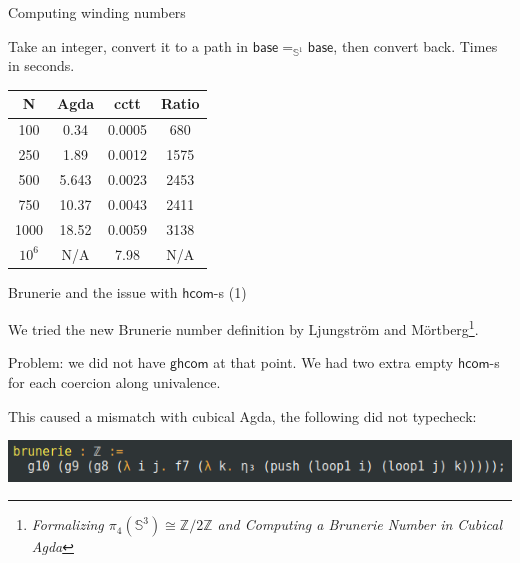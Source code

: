 \documentclass[dvipsnames]{beamer}
\newcommand{\ms}[1]{\mathsf{#1}}
\newcommand{\mbb}[1]{\mathbb{#1}}
\newcommand{\hcom}{\ms{hcom}}
\newcommand{\ghcom}{\ms{ghcom}}
\begin{document}
\begin{frame}{Computing winding numbers}

Take an integer, convert it to a path in $\ms{base} =_{\mbb{S}^1} \ms{base}$, then convert back.
Times in seconds.
\vspace{1em}

\begin{center}
\begin{tabular}{|c||c|c|c|}
\hline
  \textbf{N} & \textbf{Agda} & \textbf{cctt} & \textbf{Ratio} \\
\hline
\hline
  100 & 0.34 & 0.0005 & 680 \\
\hline
  250 & 1.89 & 0.0012 & 1575 \\
\hline
  500 & 5.643 & 0.0023 & 2453 \\
\hline
  750 & 10.37 & 0.0043 & 2411 \\
\hline
  1000 & 18.52 & 0.0059 & 3138 \\
\hline
  $10^6$ & N/A & 7.98 & N/A \\
\hline
\end{tabular}
\end{center}

\end{frame}

\begin{frame}{Brunerie and the issue with $\hcom$-s (1)}

We tried the new Brunerie number definition by Ljungström and Mörtberg\footnote{\emph{Formalizing $\pi_4(\mbb{S}^3) \cong \mbb{Z}/2\mbb{Z}$ and Computing a Brunerie Number in Cubical Agda}}.
\vspace{1em}

Problem: we did not have $\ghcom$ at that point. We had two extra empty $\hcom$-s
for each coercion along univalence.
\vspace{1em}

This caused a mismatch with cubical Agda, the following did not typecheck:
\vspace{1em}

\includegraphics[scale=0.5]{brunerie}
\end{frame}
\end{document}
